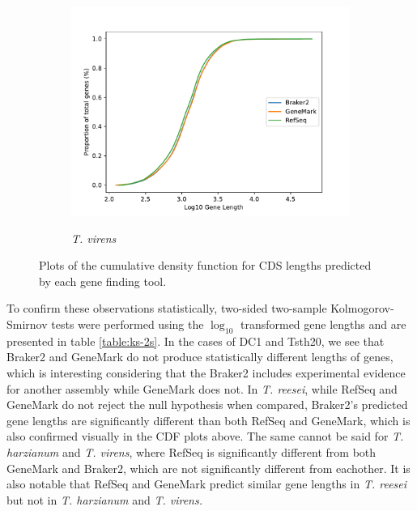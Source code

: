\begin{figure}[p!]
  \ContinuedFloat
  \centering
  \begin{subfigure}{0.7\textwidth}
    \includegraphics[width=\textwidth]{figures/t-virens-cdf-lengths-log.pdf}
    \label{fig:tvirens-lengths}
    \caption{\textit{T. virens}}
  \end{subfigure}
  \caption[Cumulative Density Function of Gene Lengths]{Plots of the
    cumulative density function for CDS lengths predicted by each gene
    finding tool.}
  \label{fig:cdf-lengths}
\end{figure}

To confirm these observations statistically, two-sided two-sample
Kolmogorov-Smirnov tests were performed using the $\log_{10}$
transformed gene lengths and are presented in table
\ref{table:ks-2s}. In the cases of DC1 and Tsth20, we see that Braker2
and GeneMark do not produce statistically different lengths of genes,
which is interesting considering that the Braker2 includes
experimental evidence for another assembly while GeneMark does not. In
\textit{T. reesei}, while RefSeq and GeneMark do not reject the null
hypothesis when compared, Braker2's predicted gene lengths are
significantly different than both RefSeq and GeneMark, which is also
confirmed visually in the CDF plots above. The same cannot be said for
\textit{T. harzianum} and \textit{T. virens}, where RefSeq is
significantly different from both GeneMark and Braker2, which are not
significantly different from eachother. It is also notable that RefSeq
and GeneMark predict similar gene lengths in \textit{T. reesei} but
not in \textit{T. harzianum} and \textit{T. virens.}

